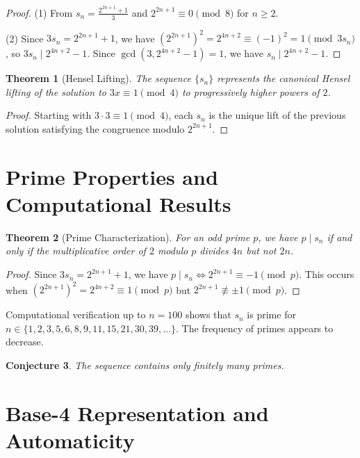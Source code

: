 \documentclass[11pt]{article}
\newtheorem{theorem}{Theorem}[section]
\newtheorem{conjecture}[theorem]{Conjecture}
\theoremstyle{definition}
\begin{document}
\begin{proof}
(1) From $s_n = \frac{2^{2n+1} + 1}{3}$ and $2^{2n+1} \equiv 0 \pmod{8}$ for $n \geq 2$.

(2) Since $3s_n = 2^{2n+1} + 1$, we have $(2^{2n+1})^2 = 2^{4n+2} \equiv (-1)^2 = 1 \pmod{3s_n}$, so $3s_n \mid 2^{4n+2} - 1$. Since $\gcd(3, 2^{4n+2} - 1) = 1$, we have $s_n \mid 2^{4n+2} - 1$.
\end{proof}

\begin{theorem}[Hensel Lifting]\label{thm:hensel}
The sequence $\{s_n\}$ represents the canonical Hensel lifting of the solution to $3x \equiv 1 \pmod{4}$ to progressively higher powers of $2$.
\end{theorem}

\begin{proof}
Starting with $3 \cdot 3 \equiv 1 \pmod{4}$, each $s_n$ is the unique lift of the previous solution satisfying the congruence modulo $2^{2n+1}$.
\end{proof}

\section{Prime Properties and Computational Results}

\begin{theorem}[Prime Characterization]\label{thm:prime-char}
For an odd prime $p$, we have $p \mid s_n$ if and only if the multiplicative order of $2$ modulo $p$ divides $4n$ but not $2n$.
\end{theorem}

\begin{proof}
Since $3s_n = 2^{2n+1} + 1$, we have $p \mid s_n \Leftrightarrow 2^{2n+1} \equiv -1 \pmod{p}$. This occurs when $(2^{2n+1})^2 = 2^{4n+2} \equiv 1 \pmod{p}$ but $2^{2n+1} \not\equiv \pm 1 \pmod{p}$.
\end{proof}

Computational verification up to $n = 100$ shows that $s_n$ is prime for $n \in \{1, 2, 3, 5, 6, 8, 9, 11, 15, 21, 30, 39, \ldots\}$. The frequency of primes appears to decrease.

\begin{conjecture}\label{conj:finite-primes}
The sequence contains only finitely many primes.
\end{conjecture}

\section{Base-4 Representation and Automaticity}
\end{document}
